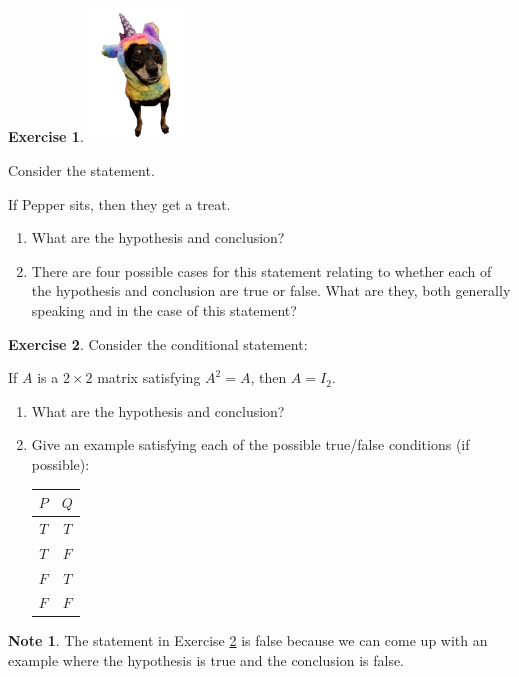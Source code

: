 \documentclass[handout]{beamer}
\newcommand{\fn}{\insertframenumber}
\theoremstyle{definition}
\newtheorem{exercise}{Exercise}
\newtheorem*{nb}{Note}
\begin{document}
\begin{frame}{\fn}
	\begin{exercise}
		\begin{minipage}{1in}
			\includegraphics[width=1in]{../images/uni_pepper}
		\end{minipage}
		\begin{minipage}{.75\textwidth}
			Consider the statement.
			
		\begin{center}
			If  Pepper sits, then they get a treat.
		\end{center}
		\begin{enumerate}[label=(\alph*)]
			\item What are the hypothesis and conclusion?
			\item There are four possible cases for this statement relating to whether each of the hypothesis and conclusion are true or false.  What are they, both generally speaking and in the case of this statement?
		\end{enumerate}
		\end{minipage}
	\end{exercise}
\end{frame}
\begin{frame}{\fn}
	\begin{exercise}\label{idem}
		Consider the conditional statement: 
		
		If $A$ is a $2\times 2$ matrix satisfying $A^2=A$, then $A=I_2$.
		\begin{enumerate}[label=(\alph*)]
			\item What are the hypothesis and conclusion?
			\item Give an example satisfying each of the possible true/false conditions (if possible):
				\begin{center}
					\begin{tabular}{c|c}
					$P$&$Q$\\
					\hline
					$T$&$T$\\
					$T$&$F$\\
					$F$&$T$\\
					$F$&$F$
				\end{tabular}
				\end{center}
		\end{enumerate}
	\end{exercise}
	\begin{nb}
		The statement in Exercise \ref{idem} is false because we can come up with an example where the hypothesis is true and the conclusion is false.  
	\end{nb}
\end{frame}
\end{document}

